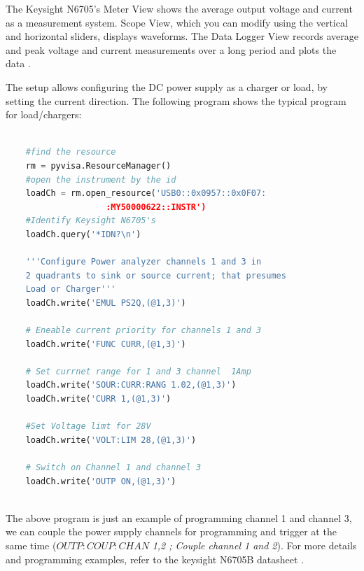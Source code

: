 The Keysight N6705's Meter View shows the average output voltage and current as a measurement system. Scope View, which you can modify using the vertical and horizontal sliders, displays waveforms. The Data Logger View records average and peak voltage and current measurements over a long period and plots the data \cite{Keysight_N6705_DC_Power_Analyzer}.

The setup allows configuring the DC power supply as a charger or load, by setting the current direction.  The following program shows the typical program for load/chargers:

\begin{lstlisting}[language=Python, caption=Load/Charger Configuration for Keysight N6705's]

    #find the resource
    rm = pyvisa.ResourceManager()
    #open the instrument by the id 
    loadCh = rm.open_resource('USB0::0x0957::0x0F07:
                    :MY50000622::INSTR')
    #Identify Keysight N6705's
    loadCh.query('*IDN?\n')
    
    '''Configure Power analyzer channels 1 and 3 in 
    2 quadrants to sink or source current; that presumes 
    Load or Charger'''
    loadCh.write('EMUL PS2Q,(@1,3)')

    # Eneable current priority for channels 1 and 3
    loadCh.write('FUNC CURR,(@1,3)')
    
    # Set currnet range for 1 and 3 channel  1Amp
    loadCh.write('SOUR:CURR:RANG 1.02,(@1,3)')
    loadCh.write('CURR 1,(@1,3)')
    
    #Set Voltage limt for 28V
    loadCh.write('VOLT:LIM 28,(@1,3)')

    # Switch on Channel 1 and channel 3
    loadCh.write('OUTP ON,(@1,3)')
    
\end{lstlisting}

The above program is just an example of programming channel 1 and channel 3, we can couple the power supply channels for programming and trigger at the same time ($OUTP:COUP:CHAN$ \textit{1,2 ; Couple channel 1 and 2}). For more details and programming examples, refer to the keysight N6705B datasheet \cite{Keysight_N6705_DC_Power_Analyzer}.

